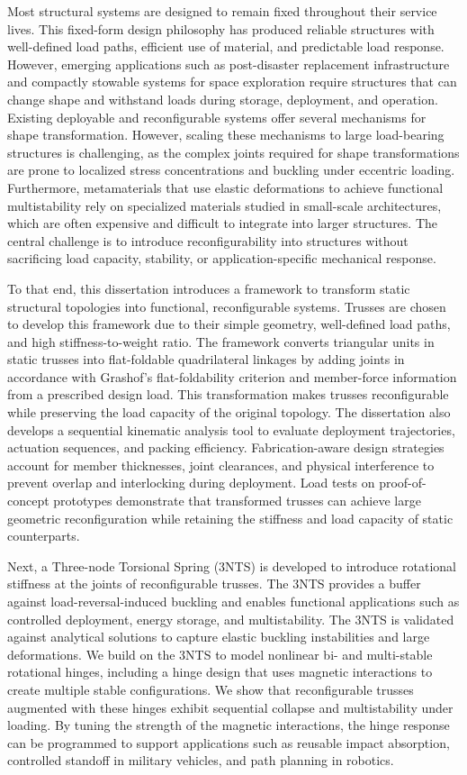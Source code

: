 Most structural systems are designed to remain fixed throughout their service lives. This fixed-form design philosophy has produced reliable structures with well-defined load paths, efficient use of material, and predictable load response. However, emerging applications such as post-disaster replacement infrastructure and compactly stowable systems for space exploration require structures that can change shape and withstand loads during storage, deployment, and operation. Existing deployable and reconfigurable systems offer several mechanisms for shape transformation. However, scaling these mechanisms to large load-bearing structures is challenging, as the complex joints required for shape transformations are prone to localized stress concentrations and buckling under eccentric loading. Furthermore, metamaterials that use elastic deformations to achieve functional multistability rely on specialized materials studied in small-scale architectures, which are often expensive and difficult to integrate into larger structures. The central challenge is to introduce reconfigurability into structures without sacrificing load capacity, stability, or application-specific mechanical response.

To that end, this dissertation introduces a framework to transform static structural topologies into functional, reconfigurable systems. Trusses are chosen to develop this framework due to their simple geometry, well-defined load paths, and high stiffness-to-weight ratio. The framework converts triangular units in static trusses into flat-foldable quadrilateral linkages by adding joints in accordance with Grashof's flat-foldability criterion and member-force information from a prescribed design load. This transformation makes trusses reconfigurable while preserving the load capacity of the original topology. The dissertation also develops a sequential kinematic analysis tool to evaluate deployment trajectories, actuation sequences, and packing efficiency. Fabrication-aware design strategies account for member thicknesses, joint clearances, and physical interference to prevent overlap and interlocking during deployment. Load tests on proof-of-concept prototypes demonstrate that transformed trusses can achieve large geometric reconfiguration while retaining the stiffness and load capacity of static counterparts.

Next, a Three-node Torsional Spring (3NTS) is developed to introduce rotational stiffness at the joints of reconfigurable trusses. The 3NTS provides a buffer against load-reversal-induced buckling and enables functional applications such as controlled deployment, energy storage, and multistability. The 3NTS is validated against analytical solutions to capture elastic buckling instabilities and large deformations. We build on the 3NTS to model nonlinear bi- and multi-stable rotational hinges, including a hinge design that uses magnetic interactions to create multiple stable configurations. We show that reconfigurable trusses augmented with these hinges exhibit sequential collapse and multistability under loading. By tuning the strength of the magnetic interactions, the hinge response can be programmed to support applications such as reusable impact absorption, controlled standoff in military vehicles, and path planning in robotics.

